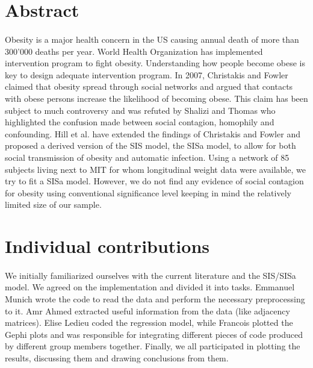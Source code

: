 \documentclass[11pt]{article}
\begin{document}
\newpage


\tableofcontents

\newpage




\section{Abstract}
\paragraph{}
Obesity is a major health concern in the US causing annual death of more than 300'000 deaths per year. World Health Organization has implemented intervention program to fight obesity.  Understanding how people become obese is key to design adequate intervention program. In 2007, Christakis and Fowler claimed that obesity spread through social networks and argued that contacts with obese persons increase the likelihood of becoming obese. This claim has been subject to much controversy and was refuted by Shalizi and Thomas who highlighted the confusion made between social contagion, homophily and confounding.  Hill et al. have extended the findings of Christakis and Fowler and proposed a derived version of the SIS model, the SISa model, to allow for both social transmission of obesity and automatic infection. Using a network of 85 subjects living next to MIT for whom longitudinal weight data were available, we try to fit a SISa model. However, we do not find any evidence of social contagion for obesity using conventional significance level keeping in mind the relatively limited size of our sample.
\pagebreak

\section{Individual contributions}
\paragraph{}
We initially familiarized ourselves with the current literature and the SIS/SISa model. We agreed on the implementation and divided it into tasks. Emmanuel Munich wrote the code to read the data and perform the necessary preprocessing to it. Amr Ahmed extracted useful information from the data (like adjacency matrices). Elise Ledieu coded the regression model, while Francois plotted the Gephi plots and was responsible for integrating different pieces of code produced by different group members together. Finally, we all participated in plotting the results, discussing them and drawing conclusions from them.
\pagebreak
\end{document}
